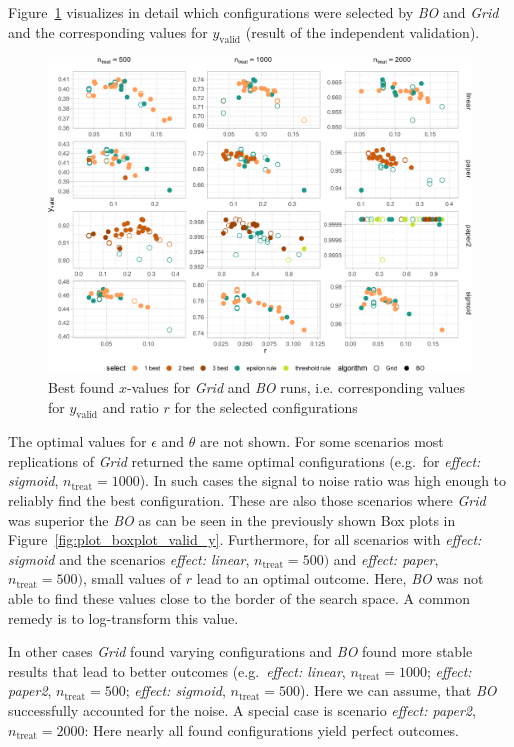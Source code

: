 \documentclass[bimj,fleqn]{w-art}
\theoremstyle{plain}
\theoremstyle{definition}
\begin{document}
Figure~\ref{fig:plot_best_x} visualizes in detail which configurations were selected by \emph{BO} and \emph{Grid} and the corresponding values for $y_{\text{valid}}$ (result of the independent validation).
\begin{figure}[htb]
\centering
\includegraphics[width=\linewidth]{generated/figures/plot_best_x.pdf}
\caption{Best found $x$-values for \emph{Grid} and \emph{BO} runs, i.e. corresponding values for $y_{\text{valid}}$ and ratio $r$ for the selected configurations}
\label{fig:plot_best_x}
\end{figure}
The optimal values for $\epsilon$ and $\theta$ are not shown.
For some scenarios most replications of \emph{Grid} returned the same optimal configurations (e.g.\ for \emph{effect: sigmoid}, $n_{\text{treat}} = 1000$).
In such cases the signal to noise ratio was high enough to reliably find the best configuration.
These are also those scenarios where \emph{Grid} was superior the \emph{BO} as can be seen in the previously shown Box plots in Figure~\ref{fig:plot_boxplot_valid_y}.
Furthermore, for all scenarios with \emph{effect: sigmoid} and the scenarios \emph{effect: linear}, $n_{\text{treat}} = 500)$ and \emph{effect: paper}, $n_{\text{treat}} = 500)$, small values of $r$ lead to an optimal outcome.
Here, \emph{BO} was not able to find these values close to the border of the search space.
A common remedy is to log-transform this value.

In other cases \emph{Grid} found varying configurations and \emph{BO} found more stable results that lead to better outcomes (e.g.\ \emph{effect: linear}, $n_{\text{treat}} = 1000$; \emph{effect: paper2}, $n_{\text{treat}} = 500$; \emph{effect: sigmoid}, $n_{\text{treat}} = 500$).
Here we can assume, that \emph{BO} successfully accounted for the noise.
A special case is scenario \emph{effect: paper2}, $n_{\text{treat}} = 2000$:
Here nearly all found configurations yield perfect outcomes.
\end{document}
